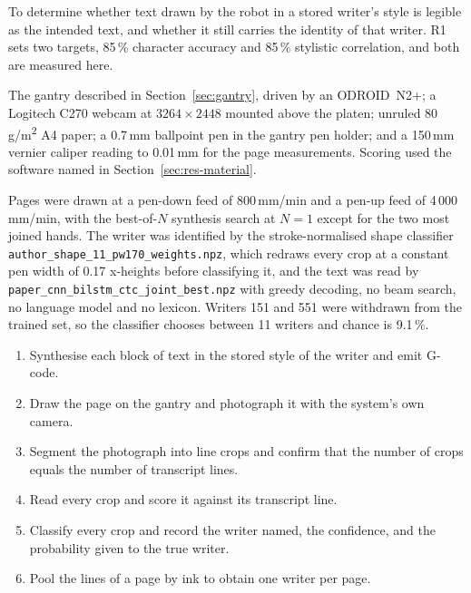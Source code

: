 \medskip

        \medskip

        To determine whether text drawn by the robot in a stored writer's style
        is legible as the intended text, and whether it still carries the
        identity of that writer. R1 sets two targets, 85\,\% character accuracy
        and 85\,\% stylistic correlation, and both are measured here.

        \medskip

        The gantry described in Section~\ref{sec:gantry}, driven by an
        ODROID~N2+; a Logitech C270 webcam at $3264\times2448$ mounted above the
        platen; unruled 80\,g/m\textsuperscript{2} A4 paper; a 0.7\,mm ballpoint
        pen in the gantry pen holder; and a 150\,mm vernier caliper reading to
        0.01\,mm for the page measurements. Scoring used the software named in
        Section~\ref{sec:res-material}.

        \medskip

        Pages were drawn at a pen-down feed of 800\,mm/min and a pen-up feed of
        4\,000\,mm/min, with the best-of-$N$ synthesis search at $N=1$ except
        for the two most joined hands. The writer was identified by the
        stroke-normalised shape classifier
        \texttt{author\_shape\_11\_pw170\_weights.npz}, which redraws every crop
        at a constant pen width of 0.17 x-heights before classifying it, and the
        text was read by \texttt{paper\_cnn\_bilstm\_ctc\_joint\_best.npz} with
        greedy decoding, no beam search, no language model and no lexicon.
        Writers 151 and 551 were withdrawn from the trained set, so the
        classifier chooses between 11 writers and chance is 9.1\,\%.

        \medskip

        \begin{enumerate}
        \item Synthesise each block of text in the stored style of the writer
              and emit G-code.
        \item Draw the page on the gantry and photograph it with the system's
              own camera.
        \item Segment the photograph into line crops and confirm that the number
              of crops equals the number of transcript lines.
        \item Read every crop and score it against its transcript line.
        \item Classify every crop and record the writer named, the confidence,
              and the probability given to the true writer.
        \item Pool the lines of a page by ink to obtain one writer per page.
        \end{enumerate}

